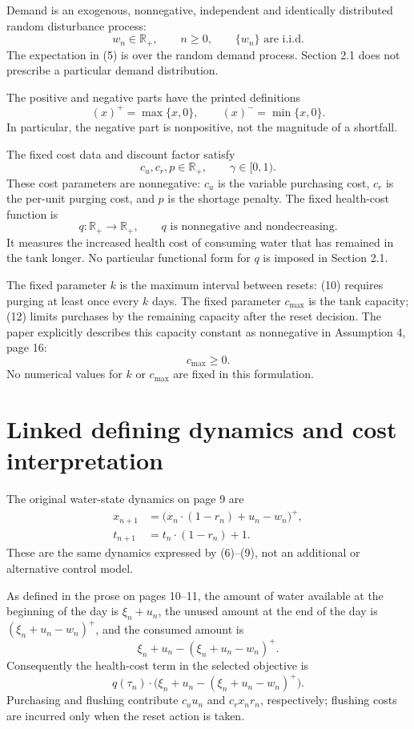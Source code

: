 \documentclass{article}
\begin{document}
Demand is an exogenous, nonnegative, independent and identically distributed random disturbance process:
\[
w_n\in\mathbb{R}_+,\qquad n\geq0,\qquad
\{w_n\}\text{ are i.i.d.}
\]
The expectation in (5) is over the random demand process. Section 2.1 does not prescribe a particular demand distribution.

The positive and negative parts have the printed definitions
\[
(x)^+=\max\{x,0\},\qquad (x)^-=\min\{x,0\}.
\]
In particular, the negative part is nonpositive, not the magnitude of a shortfall.

The fixed cost data and discount factor satisfy
\[
c_u,c_r,p\in\mathbb{R}_+,\qquad \gamma\in[0,1).
\]
These cost parameters are nonnegative: $c_u$ is the variable purchasing cost, $c_r$ is the per-unit purging cost, and $p$ is the shortage penalty. The fixed health-cost function is
\[
q:\mathbb{R}_+\longrightarrow\mathbb{R}_+,
\qquad q\text{ is nonnegative and nondecreasing}.
\]
It measures the increased health cost of consuming water that has remained in the tank longer. No particular functional form for $q$ is imposed in Section 2.1.

The fixed parameter $k$ is the maximum interval between resets: (10) requires purging at least once every $k$ days. The fixed parameter $c_{\max}$ is the tank capacity; (12) limits purchases by the remaining capacity after the reset decision. The paper explicitly describes this capacity constant as nonnegative in Assumption 4, page 16:
\[
c_{\max}\geq0.
\]
No numerical values for $k$ or $c_{\max}$ are fixed in this formulation.

\section*{Linked defining dynamics and cost interpretation}
The original water-state dynamics on page 9 are
\begin{align}
x_{n+1}&=\bigl(x_n\cdot(1-r_n)+u_n-w_n\bigr)^+,\tag{3}\\
t_{n+1}&=t_n\cdot(1-r_n)+1.\tag{4}
\end{align}
These are the same dynamics expressed by (6)--(9), not an additional or alternative control model.

As defined in the prose on pages 10--11, the amount of water available at the beginning of the day is $\xi_n+u_n$, the unused amount at the end of the day is $(\xi_n+u_n-w_n)^+$, and the consumed amount is
\[
\xi_n+u_n-(\xi_n+u_n-w_n)^+.
\]
Consequently the health-cost term in the selected objective is
\[
q(\tau_n)\cdot\bigl(\xi_n+u_n-(\xi_n+u_n-w_n)^+\bigr).
\]
Purchasing and flushing contribute $c_u u_n$ and $c_r x_n r_n$, respectively; flushing costs are incurred only when the reset action is taken.
\end{document}
